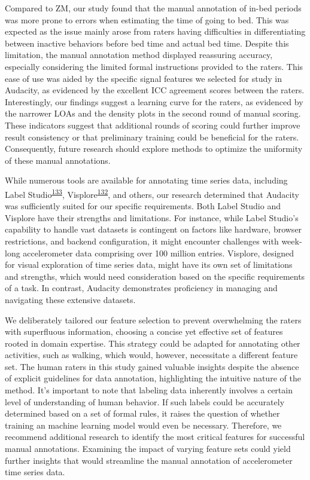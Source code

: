 \documentclass[
  10pt,
]{scrbook}
\begin{document}
Compared to ZM, our study found that the manual annotation of in-bed
periods was more prone to errors when estimating the time of going to
bed. This was expected as the issue mainly arose from raters having
difficulties in differentiating between inactive behaviors before bed
time and actual bed time. Despite this limitation, the manual annotation
method displayed reassuring accuracy, especially considering the limited
formal instructions provided to the raters. This ease of use was aided
by the specific signal features we selected for study in Audacity, as
evidenced by the excellent ICC agreement scores between the raters.
Interestingly, our findings suggest a learning curve for the raters, as
evidenced by the narrower LOAs and the density plots in the second round
of manual scoring. These indicators suggest that additional rounds of
scoring could further improve result consistency or that preliminary
training could be beneficial for the raters. Consequently, future
research should explore methods to optimize the uniformity of these
manual annotations.

While numerous tools are available for annotating time series data,
including Label
Studio\textsuperscript{\protect\hyperlink{ref-label_studio}{133}},
Visplore\textsuperscript{\protect\hyperlink{ref-visplore}{132}}, and
others, our research determined that Audacity was sufficiently suited
for our specific requirements. Both Label Studio and Visplore have their
strengths and limitations. For instance, while Label Studio's capability
to handle vast datasets is contingent on factors like hardware, browser
restrictions, and backend configuration, it might encounter challenges
with week-long accelerometer data comprising over 100 million entries.
Visplore, designed for visual exploration of time series data, might
have its own set of limitations and strengths, which would need
consideration based on the specific requirements of a task. In contrast,
Audacity demonstrates proficiency in managing and navigating these
extensive datasets.

We deliberately tailored our feature selection to prevent overwhelming
the raters with superfluous information, choosing a concise yet
effective set of features rooted in domain expertise. This strategy
could be adapted for annotating other activities, such as walking, which
would, however, necessitate a different feature set. The human raters in
this study gained valuable insights despite the absence of explicit
guidelines for data annotation, highlighting the intuitive nature of the
method. It's important to note that labeling data inherently involves a
certain level of understanding of human behavior. If such labels could
be accurately determined based on a set of formal rules, it raises the
question of whether training an machine learning model would even be
necessary. Therefore, we recommend additional research to identify the
most critical features for successful manual annotations. Examining the
impact of varying feature sets could yield further insights that would
streamline the manual annotation of accelerometer time series data.
\end{document}
